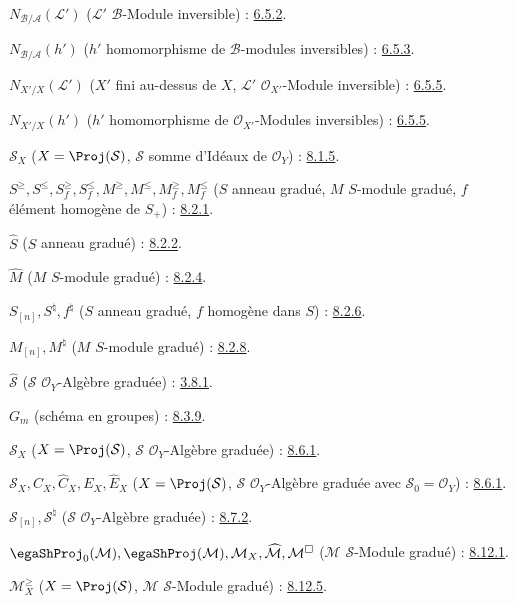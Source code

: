 $N_{\mathcal{B}/\mathcal{A}}(\mathcal{L}')$
($\mathcal{L}'$ $\mathcal{B}$-Module inversible) : \hyperref[II.6.5.2-fr]{6.5.2}.

$N_{\mathcal{B}/\mathcal{A}}(h')$
($h'$ homomorphisme de $\mathcal{B}$-modules inversibles) : \hyperref[II.6.5.3-fr]{6.5.3}.

$N_{X'/X}(\mathcal{L}')$
($X'$ fini au-dessus de $X$, $\mathcal{L}'$ $\mathcal{O}_{X'}$-Module inversible) : \hyperref[II.6.5.5-fr]{6.5.5}.

$N_{X'/X}(h')$
($h'$ homomorphisme de $\mathcal{O}_{X'}$-Modules inversibles) : \hyperref[II.6.5.5-fr]{6.5.5}.

$\mathcal{S}_X$ ($X=\Proj(\mathcal{S})$, $\mathcal{S}$ somme d'Idéaux de
$\mathcal{O}_Y$) : \hyperref[II.8.1.5-fr]{8.1.5}.

$S^\geq,S^\leq,S_f^\geq,S_f^\leq,
M^\geq,M^\leq,M_f^\geq,M_f^\leq$
($S$ anneau gradué, $M$ $S$-module gradué,
$f$ élément homogène de $S_+$) : \hyperref[II.8.2.1-fr]{8.2.1}.

$\widehat S$ ($S$ anneau gradué) : \hyperref[II.8.2.2-fr]{8.2.2}.

$\widehat M$ ($M$ $S$-module gradué) : \hyperref[II.8.2.4-fr]{8.2.4}.

$S_{[n]},S^\natural,f^\natural$
($S$ anneau gradué, $f$ homogène dans $S$) : \hyperref[II.8.2.6-fr]{8.2.6}.

$M_{[n]},M^\natural$ ($M$ $S$-module gradué) : \hyperref[II.8.2.8-fr]{8.2.8}.

$\widehat{\mathcal{S}}$ ($\mathcal{S}$ $\mathcal{O}_Y$-Algèbre graduée) : \hyperref[II.8.3.1-fr]{3.8.1}.

$G_m$ (schéma en groupes) : \hyperref[II.8.3.9-fr]{8.3.9}.

$\mathcal{S}_X$ ($X=\Proj(\mathcal{S})$, $\mathcal{S}$ $\mathcal{O}_Y$-Algèbre graduée) : \hyperref[II.8.6.1-fr]{8.6.1}.

$\mathcal{S}_X,C_X,\widehat C_X,E_X,\widehat E_X$
($X=\Proj(\mathcal{S})$, $\mathcal{S}$ $\mathcal{O}_Y$-Algèbre graduée
avec $\mathcal{S}_0=\mathcal{O}_Y$) : \hyperref[II.8.6.1-fr]{8.6.1}.

$\mathcal{S}_{[n]},\mathcal{S}^{\natural}$
($\mathcal{S}$ $\mathcal{O}_Y$-Algèbre graduée) : \hyperref[II.8.7.2-fr]{8.7.2}.

$\egaShProj_0(\mathcal{M}),\egaShProj(\mathcal{M}),\mathcal{M}_X,
\widehat{\mathcal{M}},\mathcal{M}^{\square}$
($\mathcal{M}$ $\mathcal{S}$-Module gradué) : \hyperref[II.8.12.1-fr]{8.12.1}.

$\mathcal{M}_X^\geq$
($X=\Proj(\mathcal{S})$, $\mathcal{M}$ $\mathcal{S}$-Module gradué) : \hyperref[II.8.12.5-fr]{8.12.5}.

